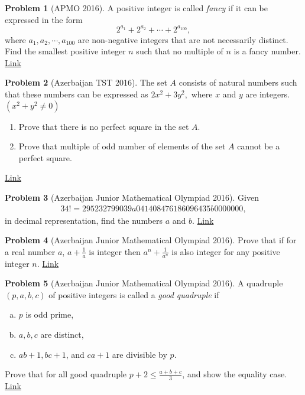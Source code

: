\documentclass[]{article}
\theoremstyle{definition}
\newtheorem{problem}{Problem}
\begin{document}
	
\begin{problem}[APMO 2016]
	A positive integer is called \textit{fancy} if it can be expressed in the form $$2^{a_1}+2^{a_2}+ \cdots+ 2^{a_{100}},$$where $a_1,a_2, \cdots, a_{100}$ are non-negative integers that are not necessarily distinct. Find the smallest positive integer $n$ such that no multiple of $n$ is a fancy number. \flushright \href{http://artofproblemsolving.com/community/c6h1243426p6362865}{Link}
\end{problem}


	
\begin{problem}[Azerbaijan TST 2016]
	The set $A$ consists of natural numbers such that these numbers can be expressed as $2x^2+3y^2,$ where $x$ and $y$ are integers. $(x^2+y^2\not=0)$
	\begin{enumerate}
		\item Prove that there is no perfect square in the set $A.$
		\item Prove that multiple of odd number of elements of the set $A$ cannot be a perfect square.
	\end{enumerate}
	\flushright \href{http://artofproblemsolving.com/community/c6h1201200p5906668}{Link}
\end{problem}


	
\begin{problem}[Azerbaijan Junior Mathematical Olympiad 2016]
	Given  
		\begin{align*}
			34!=295232799039a041408476186096435b0000000,
		\end{align*}
	in decimal representation, find the numbers $a$ and $b$. \hfill \href{http://artofproblemsolving.com/community/c6h1195518p5852632}{Link}
\end{problem}


	
\begin{problem}[Azerbaijan Junior Mathematical Olympiad 2016]
	Prove that if for a real number $a $, $a+\frac {1}{a} $ is integer then $a^n+\frac {1}{a^n} $ is also integer for any positive integer $n$. \hfill \href{http://artofproblemsolving.com/community/c6h1195519p5852637}{Link}
\end{problem}


	
\begin{problem}[Azerbaijan Junior Mathematical Olympiad 2016]
	A quadruple $(p,a,b,c)$ of positive integers is called a \textit{good quadruple} if 
		\begin{enumerate}[(a)]
			\item $p $ is odd prime,
			\item $a,b,c $ are distinct,
			\item $ab+1,bc+1$, and $ca+1$ are divisible by $p$.
		\end{enumerate}
	Prove that for all good quadruple $p+2\le \frac {a+b+c}{3} $, and show the equality case. \flushright \href{http://artofproblemsolving.com/community/c6h1195523p5852672}{Link}
\end{problem}
\end{document}
